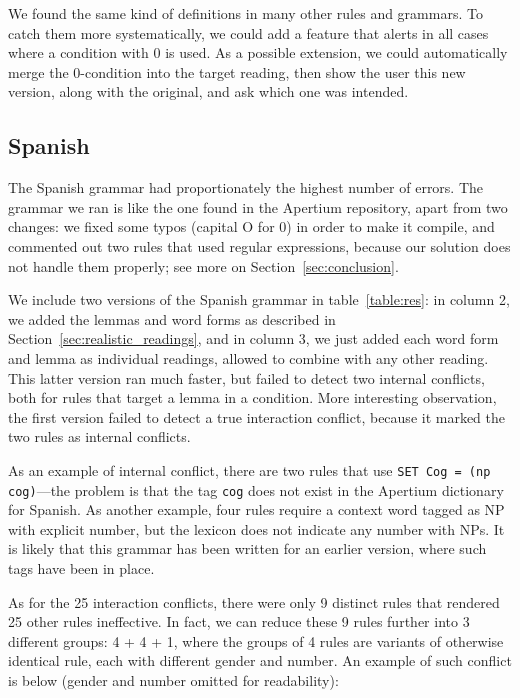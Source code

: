 We found the same kind of definitions in many other rules and grammars.
To catch them more systematically, we could add a feature that alerts in all cases where a condition with 0 is used. As a possible extension, we could automatically merge the 0-condition into the target reading, then show the user this new version, along with the original, and ask which one was intended.


\subsection{Spanish} The Spanish grammar had proportionately the
highest number of errors. The grammar we ran is like the one
found in the Apertium repository, apart from two changes: we fixed
some typos (capital O for 0) in order to make it compile, and
commented out two rules that used regular expressions, because our
solution does not handle them properly; see more on Section~\ref{sec:conclusion}.

We include two versions of the Spanish grammar in table~\ref{table:res}: in column 2, we added the lemmas and word forms as described in Section~\ref{sec:realistic_readings}, and in column 3, we just added each word form and lemma as individual readings, allowed to combine with any other reading. 
This latter version ran much faster, but failed to detect two internal conflicts, both for rules that target a lemma in a condition.
More interesting observation, the first version failed to detect a true interaction conflict, because it marked the two rules as internal conflicts.

As an example of internal conflict, there are two rules that use \texttt{SET Cog = (np cog)}---the problem is that the tag \texttt{cog} does not exist in the Apertium dictionary for Spanish. As another example, four rules require a context word tagged as NP with explicit number, but the lexicon does not indicate any number with NPs. It is likely that this grammar has been written for an earlier version, where such tags have been in place.

As for the 25 interaction conflicts, there were only 9 distinct rules that rendered 25 other rules ineffective.
In fact, we can reduce these 9 rules further into 3 different groups: 4 + 4 + 1, where the groups of 4 rules are variants of otherwise identical rule, each with different gender and number.
An example of such conflict is below (gender and number omitted for readability):

